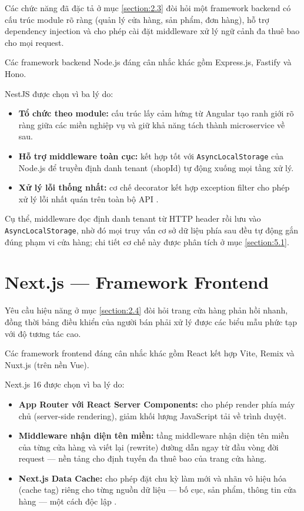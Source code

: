 \documentclass[../main.tex]{subfiles}
\begin{document}
Các chức năng đã đặc tả ở mục \ref{section:2.3} đòi hỏi một framework backend có cấu trúc module rõ ràng (quản lý cửa hàng, sản phẩm, đơn hàng), hỗ trợ dependency injection và cho phép cài đặt middleware xử lý ngữ cảnh đa thuê bao cho mọi request.

Các framework backend Node.js đáng cân nhắc khác gồm Express.js, Fastify và Hono.

NestJS được chọn vì ba lý do:

\begin{itemize}
    \item \textbf{Tổ chức theo module:} cấu trúc lấy cảm hứng từ Angular tạo ranh giới rõ ràng giữa các miền nghiệp vụ và giữ khả năng tách thành microservice về sau.
    \item \textbf{Hỗ trợ middleware toàn cục:} kết hợp tốt với \texttt{AsyncLocalStorage} của Node.js để truyền định danh tenant (shopId) tự động xuống mọi tầng xử lý.
    \item \textbf{Xử lý lỗi thống nhất:} cơ chế decorator kết hợp exception filter cho phép xử lý lỗi nhất quán trên toàn bộ API \cite{nestjs_docs}.
\end{itemize}

Cụ thể, middleware đọc định danh tenant từ HTTP header rồi lưu vào \texttt{AsyncLocalStorage}, nhờ đó mọi truy vấn cơ sở dữ liệu phía sau đều tự động gắn đúng phạm vi cửa hàng; chi tiết cơ chế này được phân tích ở mục \ref{section:5.1}.

\section{Next.js --- Framework Frontend}
\label{section:3.3}

Yêu cầu hiệu năng ở mục \ref{section:2.4} đòi hỏi trang cửa hàng phản hồi nhanh, đồng thời bảng điều khiển của người bán phải xử lý được các biểu mẫu phức tạp với độ tương tác cao.

Các framework frontend đáng cân nhắc khác gồm React kết hợp Vite, Remix và Nuxt.js (trên nền Vue).

Next.js 16 được chọn vì ba lý do:

\begin{itemize}
    \item \textbf{App Router với React Server Components:} cho phép render phía máy chủ (server-side rendering), giảm khối lượng JavaScript tải về trình duyệt.
    \item \textbf{Middleware nhận diện tên miền:} tầng middleware nhận diện tên miền của từng cửa hàng và viết lại (rewrite) đường dẫn ngay từ đầu vòng đời request --- nền tảng cho định tuyến đa thuê bao của trang cửa hàng.
    \item \textbf{Next.js Data Cache:} cho phép đặt chu kỳ làm mới và nhãn vô hiệu hóa (cache tag) riêng cho từng nguồn dữ liệu --- bố cục, sản phẩm, thông tin cửa hàng --- một cách độc lập \cite{nextjs_docs}.
\end{itemize}
\end{document}
